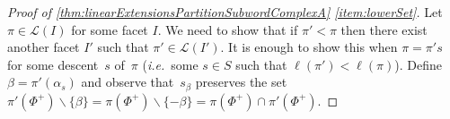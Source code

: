 \documentclass[reqno]{amsart}
\theoremstyle{definition}
\newcommand{\ssm}{\smallsetminus} %
\DeclareMathOperator{\Inv}{Inv} %
\DeclareMathOperator{\Ninv}{Ninv} %
\newcommand{\ie}{\textit{i.e.}~} %
\newcommand{\linearExtensions}{\mathcal{L}} %
\begin{document}
\begin{proof}[Proof of \cref{thm:linearExtensionsPartitionSubwordComplexA} \eqref{item:lowerSet}]
Let $\pi \in \linearExtensions(I)$ for some facet $I$.
We need to show that if $\pi' < \pi$ then there exist another facet $I'$ such that $\pi' \in \linearExtensions(I')$.
It is enough to show this when $\pi = \pi's$ for some descent~$s$ of~$\pi$ (\ie some $s\in S$ such that $\ell(\pi') < \ell(\pi)$).
Define~$\beta=\pi'(\alpha_s)$ and observe that~$s_\beta$ preserves the set~$\pi'(\Phi^+) \ssm \{\beta\} = \pi(\Phi^+) \ssm \{-\beta\} = \pi(\Phi^+) \cap \pi'(\Phi^+)$.



\end{proof}
\end{document}
